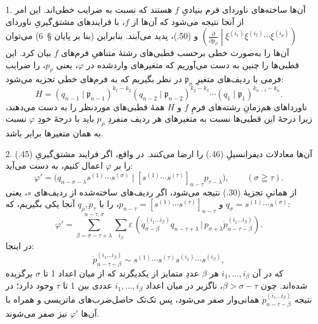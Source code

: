 \documentclass[11pt]{article}
\providecommand{\pair}[2]{(#1\,|\,#2)}
\providecommand{\eps}{\varepsilon}
\begin{document}
1. آن‌ها ساخته‌های ناوردای فرم بنیادیِ $f$ هستند که نسبت به ضرایب خطی‌اند. این امر از آنجا نتیجه می‌شود که آن‌ها از $f$، با فرایندهای مشتق‌گیریِ ناوردای $\left(\frac{\partial}{\partial p_\rho}\middle|\xi^{(i_1)}\xi^{(i_2)}\cdots\xi^{(i_\rho)}\right)$ و (50.)، پدید می‌آیند. بنابراین (بنا بر پایان \S\ 6) می‌توان آن‌ها را به‌صورت خطی برحسب قطبی‌های رشتهٔ متناهیِ فرم‌های $f$ بیان کرد. این قطبی‌ها را چنین به دست می‌آوریم که متغیرهای واردشده در $\varphi$، یعنی $p_\rho$، را ضرایب فرمی با ردیف‌های متغیرِ $\mathfrak{p}_\sigma$ در نظر بگیریم که به فرم‌های خطی تجزیه می‌شود:
\begin{equation}
 H=(q_{n-1}\mid \mathfrak{p}_{n-1})^{k_1-k_2}(q_{n-2}\mid \mathfrak{p}_{n-2})^{k_2-k_3}\cdots(q_1\mid \mathfrak{p}_1)^{k_{n-1}-k_n}.
\tag{52}
\end{equation}
ناورداهای هم‌زمانِ رشته‌های فرمِ $f$ و $H$ همهٔ قطبی‌های موردنظر را به دست می‌دهند، زیرا درجهٔ این قطبی‌ها نسبت به متغیرهای هر ردیف منفردِ $p_\rho$ باید با درجهٔ خودِ $\varphi$ نسبت به همان متغیرها برابر باشد.

2. آن‌ها معادلات دیفرانسیلِ (46.) را ارضا می‌کنند. در واقع، اگر فرایند مشتق‌گیریِ (45.) را بر $\varphi$ اعمال کنیم، به دست می‌آید:
\[
 \varphi'=\bigl(q_{n-\sigma-\lambda}s^{(1)}\cdots s^{(\sigma)}\mid [s^{(1)}\cdots s^{(\tau)}]_{n-\tau}p_{\tau-\lambda}\bigr),\qquad (\sigma\geqq\tau).
\]
از همانیِ تجزیهٔ (30.) نتیجه می‌شود، اگر ردیف‌های ساخته‌شده از ردیف‌های $s$، یعنی $q_\sigma=s^{(1)}\cdots s^{(\sigma)}$ و $p_{n-\tau}=[s^{(1)}\cdots s^{(\tau)}]_{n-\tau}$، را با $q_\rho,p_\tau$ آنجا یکی بگیریم، که:
\[
 \varphi'=\sum_{\beta=\sigma-\tau+\lambda}^{n-\tau,\sigma}\sum_{i_\beta}\eps\,
 \pair{\dot{q}_{\sigma-\beta}^{(i_1\ldots i_\beta)}q_{n-\tau+\lambda}}{p_{\sigma+\lambda}\dot{p}_{n-\tau-\beta}^{(i_1\ldots i_\beta)}}.
\]
در اینجا:
\[
 \dot{p}_{n-\tau-\beta}^{(i_1\ldots i_\beta)}\sim s^{(1)}\cdots s^{(\tau)}s^{(i_1)}\cdots s^{(i_\beta)},
\]
که در آن $i_1,\ldots,i_\beta$ هر $\beta$ عددِ متمایز از یکدیگرند که از میان اعداد 1 تا $\sigma$ برگزیده شده‌اند. چون $\beta>\sigma-\tau$، ناگزیر در میان اعداد $i_1,\ldots,i_\beta$ عددی بین 1 تا $\tau$ وجود دارد؛ در نتیجه $\dot{p}_{n-\tau-\beta}^{(i_1\ldots i_\beta)}$ همانی‌وار صفر می‌شود، پس تک‌تک حاصل‌ضرب‌های ماتریسی و همراه با آن‌ها $\varphi'$ نیز صفر می‌شوند.
\end{document}

